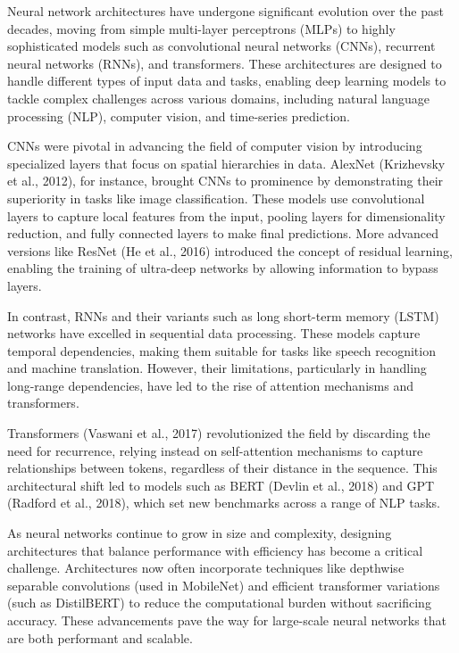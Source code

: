 \documentclass{article} %
\begin{document}
Neural network architectures have undergone significant evolution over the past decades, moving from simple multi-layer perceptrons (MLPs) to highly sophisticated models such as convolutional neural networks (CNNs), recurrent neural networks (RNNs), and transformers. These architectures are designed to handle different types of input data and tasks, enabling deep learning models to tackle complex challenges across various domains, including natural language processing (NLP), computer vision, and time-series prediction.

CNNs were pivotal in advancing the field of computer vision by introducing specialized layers that focus on spatial hierarchies in data. AlexNet (Krizhevsky et al., 2012), for instance, brought CNNs to prominence by demonstrating their superiority in tasks like image classification. These models use convolutional layers to capture local features from the input, pooling layers for dimensionality reduction, and fully connected layers to make final predictions. More advanced versions like ResNet (He et al., 2016) introduced the concept of residual learning, enabling the training of ultra-deep networks by allowing information to bypass layers.

In contrast, RNNs and their variants such as long short-term memory (LSTM) networks have excelled in sequential data processing. These models capture temporal dependencies, making them suitable for tasks like speech recognition and machine translation. However, their limitations, particularly in handling long-range dependencies, have led to the rise of attention mechanisms and transformers.

Transformers (Vaswani et al., 2017) revolutionized the field by discarding the need for recurrence, relying instead on self-attention mechanisms to capture relationships between tokens, regardless of their distance in the sequence. This architectural shift led to models such as BERT (Devlin et al., 2018) and GPT (Radford et al., 2018), which set new benchmarks across a range of NLP tasks.

As neural networks continue to grow in size and complexity, designing architectures that balance performance with efficiency has become a critical challenge. Architectures now often incorporate techniques like depthwise separable convolutions (used in MobileNet) and efficient transformer variations (such as DistilBERT) to reduce the computational burden without sacrificing accuracy. These advancements pave the way for large-scale neural networks that are both performant and scalable.
\end{document}
